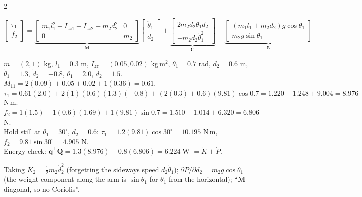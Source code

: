 \begin{multicols}{2}
\begin{fbx}
\[\begin{bmatrix}\tau_1\\f_2\end{bmatrix}=\underbrace{\begin{bmatrix}m_1l_1^2+I_{zz1}+I_{zz2}+m_2d_2^2&0\\0&m_2\end{bmatrix}}_{\mathbf M}\begin{bmatrix}\ddot\theta_1\\\ddot d_2\end{bmatrix}+\underbrace{\begin{bmatrix}2m_2d_2\dot\theta_1\dot d_2\\-m_2d_2\dot\theta_1^2\end{bmatrix}}_{\mathbf C}+\underbrace{\begin{bmatrix}(m_1l_1+m_2d_2)g\cos\theta_1\\m_2g\sin\theta_1\end{bmatrix}}_{\mathbf g}\]
\end{fbx}
\begin{worked}[numbers]
$m=(2,1)$ kg, $l_1=0.3$ m, $I_{zz}=(0.05,0.02)$ kg\,m$^2$, $\theta_1=0.7$ rad, $d_2=0.6$ m, $\dot\theta_1=1.3$, $\dot d_2=-0.8$, $\ddot\theta_1=2.0$, $\ddot d_2=1.5$.\\
$M_{11}=2(0.09)+0.05+0.02+1(0.36)=0.61$. $\tau_1=0.61(2.0)+2(1)(0.6)(1.3)(-0.8)+(2(0.3)+0.6)(9.81)\cos0.7=1.220-1.248+9.004=\boxed{8.976}$ N\,m.\\
$f_2=1(1.5)-1(0.6)(1.69)+1(9.81)\sin0.7=1.500-1.014+6.320=\boxed{6.806}$ N.\\
Hold still at $\theta_1=30^\circ$, $d_2=0.6$: $\tau_1=1.2(9.81)\cos30^\circ=10.195$ N\,m, $f_2=9.81\sin30^\circ=4.905$ N.\\
Energy check: $\dot{\mathbf q}^\top\mathbf Q=1.3(8.976)-0.8(6.806)=6.224$ W $=\dot K+\dot P$. \chk
\end{worked}
\begin{trap}
Taking $K_2=\tfrac12m_2\dot d_2^2$ (forgetting the sideways speed $d_2\dot\theta_1$); $\partial P/\partial d_2=m_2g\cos\theta_1$ (the weight component along the arm is $\sin\theta_1$ for $\theta_1$ from the horizontal); ``$\mathbf M$ diagonal, so no Coriolis''.
\end{trap}


\end{multicols}

